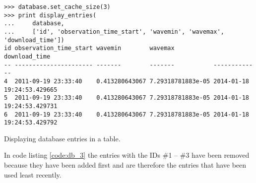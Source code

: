 \begin{listing}
\begin{verbatim}
>>> database.set_cache_size(3)
>>> print display_entries(
...     database,
...     ['id', 'observation_time_start', 'wavemin', 'wavemax', 'download_time'])
id observation_time_start wavemin        wavemax           download_time             
-- ---------------------- -------        -------           -------------             
4  2011-09-19 23:33:40    0.413280643067 7.29318781883e-05 2014-01-18 19:24:53.429665
5  2011-09-19 23:33:40    0.413280643067 7.29318781883e-05 2014-01-18 19:24:53.429731
6  2011-09-19 23:33:40    0.413280643067 7.29318781883e-05 2014-01-18 19:24:53.429792
\end{verbatim}
\caption{Displaying database entries in a table.}
\label{code:db_3}
\end{listing}

In code listing \ref{code:db_3} the entries with the IDs \#1 -- \#3 have been
removed because they have been added first and are therefore the entries that
have been used least recently.
